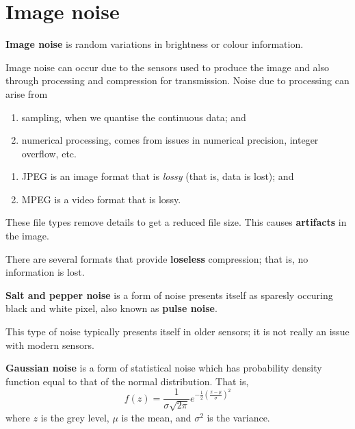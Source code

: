 \chapter{Image noise}


\begin{definition}
    \textbf{Image noise} is random variations in brightness or colour information.
\end{definition}

Image noise can occur due to the sensors used to produce the image and also through processing and compression for transmission. Noise due to processing can arise from
\begin{enumerate}
    \item sampling, when we quantise the continuous data; and
    \item numerical processing, comes from issues in numerical precision, integer overflow, etc.
\end{enumerate}

\begin{example}
    \begin{enumerate}
        \item JPEG is an image format that is \emph{lossy} (that is, data is lost); and
        \item MPEG is a video format that is lossy.
    \end{enumerate}
    These file types remove details to get a reduced file size. This causes \textbf{artifacts} in the image.
\end{example}

There are several formats that provide \textbf{loseless} compression; that is, no information is lost.

\begin{definition}
    \textbf{Salt and pepper noise} is a form of noise presents itself as sparesly occuring black and white pixel, also known as \textbf{pulse noise}.
\end{definition}

This type of noise typically presents itself in older sensors; it is not really an issue with modern sensors. 

\begin{definition}
    \textbf{Gaussian noise} is a form of statistical noise which has probability density function equal to that of the normal distribution. That is, 
    \[ f(z) = \frac{1}{\sigma \sqrt{2\pi}} e^{-\frac12\left(\frac{x - \mu}{\sigma}\right)^2} \]
    where $z$ is the grey level, $\mu$ is the mean, and $\sigma^2$ is the variance.
\end{definition}

